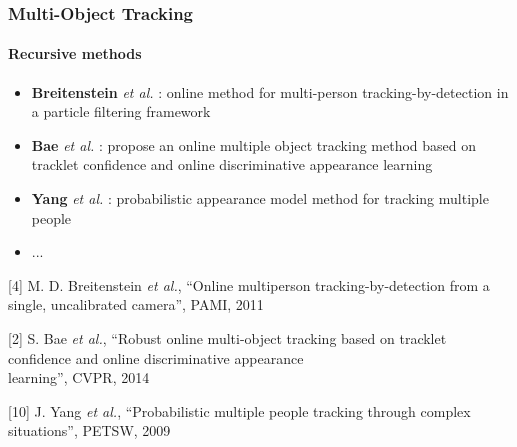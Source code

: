 \begin{frame}
	\frametitle{Multi-Object Tracking}
	\framesubtitle{Recursive methods}
	
	\Large
	
	\vspace{0.05cm}
	
	\begin{itemize}
		\item \textbf{Breitenstein} \emph{et al.} \cite{Breitenstein11}: online method for
			  multi-person tracking-by-detection in a particle filtering framework
		\item \textbf{Bae} \emph{et al.} \cite{Bae14}: propose an online multiple object
			  tracking method based on tracklet confidence and online discriminative appearance learning
		\item \textbf{Yang} \emph{et al.} \cite{Yang09}: probabilistic appearance model
			  method for tracking multiple people
		\item ...
	\end{itemize}
	
	\vspace{0.15cm}
	
	\tiny
	
	[4] M. D. Breitenstein \emph{et al.}, ``Online multiperson tracking-by-detection from a single,
		uncalibrated camera'', PAMI, 2011
	
	\vspace{0.05cm}
	
	[2] S. Bae \emph{et al.}, ``Robust online multi-object tracking based on tracklet confidence and
		online discriminative appearance\\ \hspace{0.25cm} learning'', CVPR, 2014
	
	\vspace{-0.19cm}
	
	[10] J. Yang \emph{et al.}, ``Probabilistic multiple people tracking through complex situations'',
		 PETSW, 2009
\end{frame}

